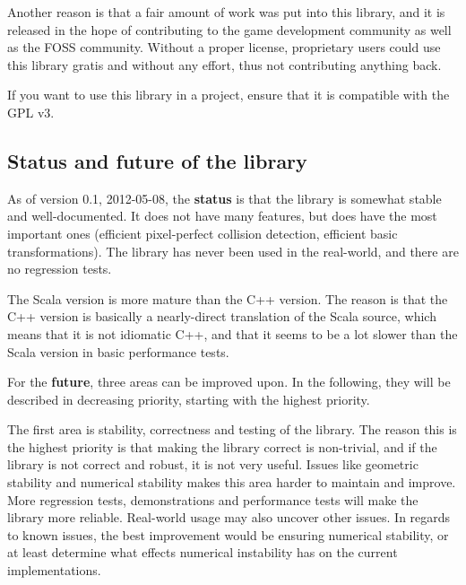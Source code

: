 Another reason is that a fair amount of work was put into this library,
and it is released in the hope of contributing to the game development
community as well as the FOSS community. Without a proper license,
proprietary users could use this library gratis and without any effort,
thus not contributing anything back.

If you want to use this library in a project, ensure that it is compatible
with the GPL v3.

\subsection{Status and future of the library}

As of version 0.1, 2012-05-08, the \textbf{status} is that the library is somewhat stable and well-documented.
It does not have many features, but does have the most important ones
(efficient pixel-perfect collision detection, efficient basic transformations).
The library has never been used in the real-world, and there are no regression
tests.

The Scala version is more mature than the C++ version.
The reason is that the C++ version is basically a nearly-direct translation
of the Scala source, which means that it is not idiomatic C++, and that
it seems to be a lot slower than the Scala version in basic performance tests.

For the \textbf{future}, three areas can be improved upon.
In the following, they will be described in decreasing priority,
starting with the highest priority.

The first area is stability, correctness and testing of the library.
The reason this is the highest priority is that making the library
correct is non-trivial, and if the library is not correct and robust,
it is not very useful. Issues like geometric stability
and numerical stability makes this area harder to maintain and improve.
More regression tests, demonstrations and performance tests will
make the library more reliable. Real-world usage may also uncover
other issues. In regards to known issues, the best improvement would
be ensuring numerical stability, or at least determine what effects
numerical instability has on the current implementations.

